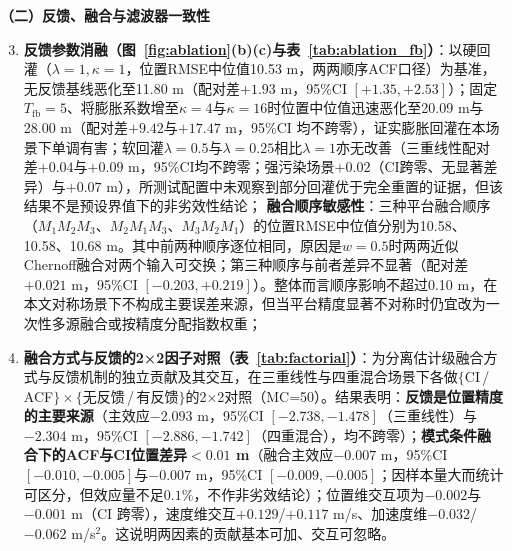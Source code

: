 \documentclass[UTF8,a4paper,zihao=-4]{ctexart}
\begin{document}
\noindent\textbf{（二）反馈、融合与滤波器一致性}\par
\begin{enumerate}\setcounter{enumi}{2}
\item \textbf{反馈参数消融（图~\ref{fig:ablation}(b)(c)与表~\ref{tab:ablation_fb}）}：以硬回灌（$\lambda=1,\kappa=1$，位置RMSE中位值10.53 m，两两顺序ACF口径）为基准，无反馈基线恶化至11.80 m（配对差$+1.93$ m，95\%CI $[+1.35,+2.53]$）；固定$T_{\mathrm{fb}}=5$、将膨胀系数增至$\kappa=4$与$\kappa=16$时位置中位值迅速恶化至20.09 m与28.00 m（配对差$+9.42$与$+17.47$ m，95\%CI 均不跨零），证实膨胀回灌在本场景下单调有害；软回灌$\lambda=0.5$与$\lambda=0.25$相比$\lambda=1$亦无改善（三重线性配对差$+0.04$与$+0.09$ m，95\%CI均不跨零；强污染场景$+0.02$（CI跨零、无显著差异）与$+0.07$ m），所测试配置中未观察到部分回灌优于完全重置的证据，但该结果不是预设界值下的非劣效性结论； \textbf{融合顺序敏感性}：三种平台融合顺序（$M_1M_2M_3$、$M_2M_1M_3$、$M_3M_2M_1$）的位置RMSE中位值分别为10.58、10.58、10.68 m。其中前两种顺序逐位相同，原因是$w=0.5$时两两近似Chernoff融合对两个输入可交换；第三种顺序与前者差异不显著（配对差$+0.021$ m，95\%CI $[-0.203,+0.219]$）。整体而言顺序影响不超过0.10 m，在本文对称场景下不构成主要误差来源，但当平台精度显著不对称时仍宜改为一次性多源融合或按精度分配指数权重；

\item \textbf{融合方式与反馈的2×2因子对照（表~\ref{tab:factorial}）}：为分离估计级融合方式与反馈机制的独立贡献及其交互，在三重线性与四重混合场景下各做$\{$CI\,/\,ACF$\}\times\{$无反馈\,/\,有反馈$\}$的2×2对照（MC=50）。结果表明：\textbf{反馈是位置精度的主要来源}（主效应$-2.093$ m，95\%CI $[-2.738,-1.478]$（三重线性）与$-2.304$ m，95\%CI $[-2.886,-1.742]$（四重混合），均不跨零）；\textbf{模式条件融合下的ACF与CI位置差异$<0.01$ m}（融合主效应$-0.007$ m，95\%CI $[-0.010,-0.005]$与$-0.007$ m，95\%CI $[-0.009,-0.005]$；因样本量大而统计可区分，但效应量不足$0.1\%$，不作非劣效结论）；位置维交互项为$-0.002$与$-0.001$ m（CI 跨零），速度维交互$+0.129$/$+0.117$ m/s、加速度维$-0.032$/$-0.062$ m/s$^2$。这说明两因素的贡献基本可加、交互可忽略。


\end{enumerate}
\end{document}
